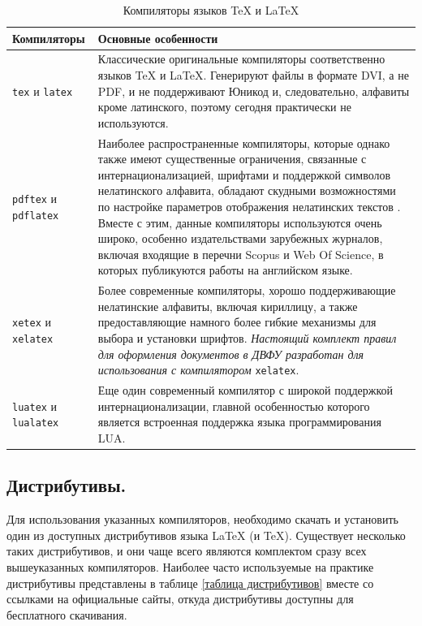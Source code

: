 \documentclass[report, draught]{fefudoc}
\begin{document}
\begin{table}
\centering
\caption{Компиляторы языков \TeX{} и \LaTeX{}}
\label{таблица компиляторов}
\begin{tabularx}{\textwidth}{|l|X|}
\hline
\textbf{Компиляторы} & \textbf{Основные особенности} \\ \hline
\texttt{tex} и \texttt{latex} & Классические оригинальные компиляторы соответственно языков \TeX{} и \LaTeX{}. Генерируют файлы в формате DVI, а не PDF, и не поддерживают Юникод и, следовательно, алфавиты кроме латинского, поэтому сегодня практически не используются. \\ \hline
\texttt{pdftex} и \texttt{pdflatex} & Наиболее распространенные компиляторы, которые однако также имеют существенные ограничения, связанные с интернационализацией, шрифтами и поддержкой символов нелатинского алфавита, обладают скудными возможностями по настройке параметров отображения нелатинских текстов \cite{ПособиеLatex}. Вместе с этим, данные компиляторы используются очень широко, особенно издательствами зарубежных журналов, включая входящие в перечни Scopus и Web Of Science, в которых публикуются работы на английском языке. \\ \hline
\texttt{xetex} и \texttt{xelatex} & Более современные компиляторы, хорошо поддерживающие нелатинские алфавиты, включая кириллицу, а также предоставляющие намного более гибкие механизмы для выбора и установки шрифтов. \textit{Настоящий комплект правил для оформления документов в ДВФУ разработан для использования с компилятором} \texttt{xelatex}. \\ \hline
\texttt{luatex} и \texttt{lualatex} & Еще один современный компилятор с широкой поддержкой интернационализации, главной особенностью которого является встроенная поддержка языка программирования LUA. \\ \hline
\end{tabularx}
\end{table}

\subsection{Дистрибутивы.}\label{раздел про дистрибутивы}
Для использования указанных компиляторов, необходимо скачать и установить один из доступных дистрибутивов языка \LaTeX{} (и \TeX{}).
Существует несколько таких дистрибутивов, и они чаще всего являются комплектом сразу всех вышеуказанных компиляторов.
Наиболее часто используемые на практике дистрибутивы представлены в таблице \ref{таблица дистрибутивов} вместе со ссылками на официальные сайты, откуда дистрибутивы доступны для бесплатного скачивания.
\end{document}
